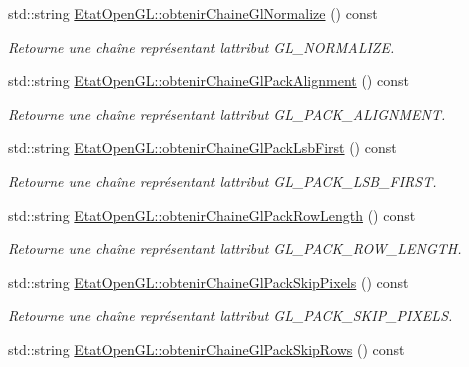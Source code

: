 \begin{DoxyCompactItemize}
std\+::string \hyperlink{group__utilitaire_gab8f8c7f8e749817f94751308b2344af4}{Etat\+Open\+G\+L\+::obtenir\+Chaine\+Gl\+Normalize} () const 
\begin{DoxyCompactList}\small\item\em Retourne une chaîne représentant l\textquotesingle{}attribut G\+L\+\_\+\+N\+O\+R\+M\+A\+L\+I\+Z\+E. \end{DoxyCompactList}\item 
std\+::string \hyperlink{group__utilitaire_ga7b46757dfa6068f0833baab8d98d2c2a}{Etat\+Open\+G\+L\+::obtenir\+Chaine\+Gl\+Pack\+Alignment} () const 
\begin{DoxyCompactList}\small\item\em Retourne une chaîne représentant l\textquotesingle{}attribut G\+L\+\_\+\+P\+A\+C\+K\+\_\+\+A\+L\+I\+G\+N\+M\+E\+N\+T. \end{DoxyCompactList}\item 
std\+::string \hyperlink{group__utilitaire_ga49cc9b47a26f144e0651b4679752a02c}{Etat\+Open\+G\+L\+::obtenir\+Chaine\+Gl\+Pack\+Lsb\+First} () const 
\begin{DoxyCompactList}\small\item\em Retourne une chaîne représentant l\textquotesingle{}attribut G\+L\+\_\+\+P\+A\+C\+K\+\_\+\+L\+S\+B\+\_\+\+F\+I\+R\+S\+T. \end{DoxyCompactList}\item 
std\+::string \hyperlink{group__utilitaire_ga64b0337d0f84557f6f8661ec6e03e154}{Etat\+Open\+G\+L\+::obtenir\+Chaine\+Gl\+Pack\+Row\+Length} () const 
\begin{DoxyCompactList}\small\item\em Retourne une chaîne représentant l\textquotesingle{}attribut G\+L\+\_\+\+P\+A\+C\+K\+\_\+\+R\+O\+W\+\_\+\+L\+E\+N\+G\+T\+H. \end{DoxyCompactList}\item 
std\+::string \hyperlink{group__utilitaire_gadb44f6347d29047a0a3789c51f4913f6}{Etat\+Open\+G\+L\+::obtenir\+Chaine\+Gl\+Pack\+Skip\+Pixels} () const 
\begin{DoxyCompactList}\small\item\em Retourne une chaîne représentant l\textquotesingle{}attribut G\+L\+\_\+\+P\+A\+C\+K\+\_\+\+S\+K\+I\+P\+\_\+\+P\+I\+X\+E\+L\+S. \end{DoxyCompactList}\item 
std\+::string \hyperlink{group__utilitaire_ga13b70d48642c0b921c0497f1ed7e88fa}{Etat\+Open\+G\+L\+::obtenir\+Chaine\+Gl\+Pack\+Skip\+Rows} () const 

\end{DoxyCompactItemize}
